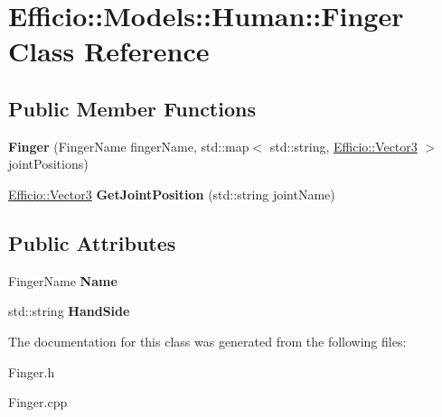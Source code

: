 \hypertarget{class_efficio_1_1_models_1_1_human_1_1_finger}{}\section{Efficio\+:\+:Models\+:\+:Human\+:\+:Finger Class Reference}
\label{class_efficio_1_1_models_1_1_human_1_1_finger}
\subsection*{Public Member Functions}
\begin{DoxyCompactItemize}
\item 
{\bfseries Finger} (Finger\+Name finger\+Name, std\+::map$<$ std\+::string, \hyperlink{class_efficio_1_1_vector3}{Efficio\+::\+Vector3} $>$ joint\+Positions)\hypertarget{class_efficio_1_1_models_1_1_human_1_1_finger_adba563997e627ad79efc039f3189907f}{}\label{class_efficio_1_1_models_1_1_human_1_1_finger_adba563997e627ad79efc039f3189907f}

\item 
\hyperlink{class_efficio_1_1_vector3}{Efficio\+::\+Vector3} {\bfseries Get\+Joint\+Position} (std\+::string joint\+Name)\hypertarget{class_efficio_1_1_models_1_1_human_1_1_finger_acf814b30ef13a7495003aa073d1ea66a}{}\label{class_efficio_1_1_models_1_1_human_1_1_finger_acf814b30ef13a7495003aa073d1ea66a}

\end{DoxyCompactItemize}
\subsection*{Public Attributes}
\begin{DoxyCompactItemize}
\item 
Finger\+Name {\bfseries Name}\hypertarget{class_efficio_1_1_models_1_1_human_1_1_finger_ae73134fdf9c0ba485fce08abdf2e5e59}{}\label{class_efficio_1_1_models_1_1_human_1_1_finger_ae73134fdf9c0ba485fce08abdf2e5e59}

\item 
std\+::string {\bfseries Hand\+Side}\hypertarget{class_efficio_1_1_models_1_1_human_1_1_finger_a7dbe93f9094453f1f7bf8b17bd51f5e2}{}\label{class_efficio_1_1_models_1_1_human_1_1_finger_a7dbe93f9094453f1f7bf8b17bd51f5e2}

\end{DoxyCompactItemize}


The documentation for this class was generated from the following files\+:\begin{DoxyCompactItemize}
\item 
Finger.\+h\item 
Finger.\+cpp\end{DoxyCompactItemize}
